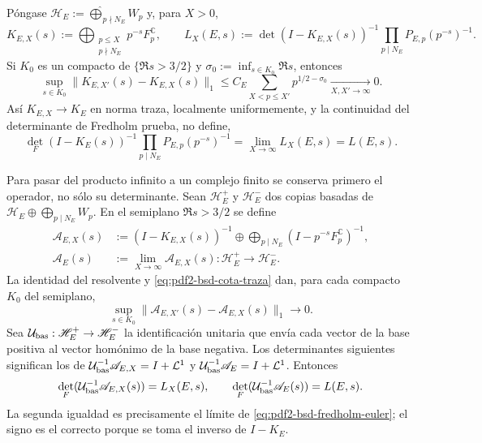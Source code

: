 Póngase $\mathscr H_E:=\widehat\bigoplus_{p\nmid N_E}W_p$ y, para $X>0$,
\begin{equation}\label{eq:pdf2-bsd-truncados-fredholm}
 K_{E,X}(s):=\bigoplus_{\substack{p\leq X\\p\nmid N_E}}
          p^{-s}F_p^{\mathbb C},
 \qquad
 L_X(E,s):=\det(I-K_{E,X}(s))^{-1}
       \prod_{p\mid N_E}P_{E,p}(p^{-s})^{-1}.
\end{equation}
Si $K_0$ es un compacto de $\{\Re s>3/2\}$ y
$\sigma_0:=\inf_{s\in K_0}\Re s$, entonces
\begin{equation}\label{eq:pdf2-bsd-cota-traza}
 \sup_{s\in K_0}\|K_{E,X'}(s)-K_{E,X}(s)\|_1
 \leq C_E\sum_{X<p\leq X'}p^{1/2-\sigma_0}
 \xrightarrow[X,X'\to\infty]{}0.
\end{equation}
Así $K_{E,X}\to K_E$ en norma traza, localmente uniformemente, y la
continuidad del determinante de Fredholm prueba, no define,
\begin{equation}\label{eq:pdf2-bsd-fredholm-euler}
 \det_F(I-K_E(s))^{-1}
 \prod_{p\mid N_E}P_{E,p}(p^{-s})^{-1}
 =\lim_{X\to\infty}L_X(E,s)=L(E,s).
\end{equation}

Para pasar del producto infinito a un complejo finito se conserva primero el
operador, no sólo su determinante. Sean $\mathscr H_E^+$ y
$\mathscr H_E^-$ dos copias basadas de
$\mathscr H_E\oplus\bigoplus_{p\mid N_E}W_p$. En el semiplano
$\Re s>3/2$ se define
\begin{equation}\label{eq:pdf2-bsd-operadores-euler-inversos}
 \begin{aligned}
  \mathscr A_{E,X}(s)&:=
   (I-K_{E,X}(s))^{-1}\oplus
   \bigoplus_{p\mid N_E}(I-p^{-s}F_p^{\mathbb C})^{-1},\\
  \mathscr A_E(s)&:=\lim_{X\to\infty}\mathscr A_{E,X}(s):
       \mathscr H_E^+\longrightarrow\mathscr H_E^-.
 \end{aligned}
\end{equation}
La identidad del resolvente y \eqref{eq:pdf2-bsd-cota-traza} dan, para cada
compacto $K_0$ del semiplano,
\begin{equation}\label{eq:pdf2-bsd-resolvente-convergencia-traza}
 \sup_{s\in K_0}
 \|\mathscr A_{E,X'}(s)-\mathscr A_{E,X}(s)\|_1\longrightarrow0.
\end{equation}
Sea $\mathcal U_{\rm bas}:\mathscr H_E^+\to\mathscr H_E^-$ la identificación unitaria que
envía cada vector de la base positiva al vector homónimo de la base
negativa. Los determinantes siguientes significan los de
$\mathcal U_{\rm bas}^{-1}\mathscr A_{E,X}=I+\mathcal L^1$ y
$\mathcal U_{\rm bas}^{-1}\mathscr A_E=I+\mathcal L^1$. Entonces
\begin{equation}\label{eq:pdf2-bsd-det-a-x-l-x}
 \det_F(\mathcal U_{\rm bas}^{-1}\mathscr A_{E,X}(s))=L_X(E,s),
 \qquad
 \det_F(\mathcal U_{\rm bas}^{-1}\mathscr A_E(s))=L(E,s).
\end{equation}
La segunda igualdad es precisamente el límite de
\eqref{eq:pdf2-bsd-fredholm-euler}; el signo es el correcto porque se toma el
inverso de $I-K_E$.

